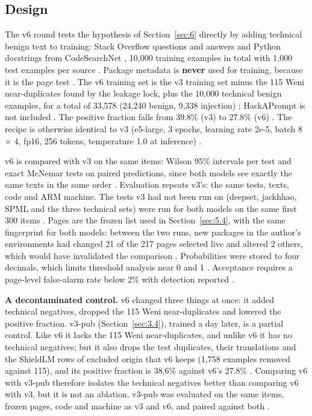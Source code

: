 \documentclass[11pt]{article}
\begin{document}
\subsection{Design}\label{sec:7.1}

The v6 round tests the hypothesis of Section~\ref{sec:6} directly by adding technical benign text to training: Stack Overflow questions and answers \citep{pacovaldez2022soquestions, koutch2023sopython} and Python docstrings from CodeSearchNet \citep{husain2019codesearchnet, nando2023codesearchnetpython}, 10,000 training examples in total with 1,000 test examples per source%
. Package metadata is \textbf{never} used for training, because it is the page test%
. The v6 training set is the v3 training set minus the 115 Weni near-duplicates found by the leakage lock, plus the 10,000 technical benign examples, for a total of 33,578 (24,240 benign, 9,338 injection)%
; HackAPrompt is not included%
. The positive fraction falls from 39.8\% (v3) to 27.8\% (v6)%
. The recipe is otherwise identical to v3 (e5-large, 3 epochs, learning rate 2e-5, batch 8 \ensuremath{\times} 4, fp16, 256 tokens, temperature 1.0 at inference)%
.

v6 is compared with v3 on the same items: Wilson 95\% intervals per test and exact McNemar tests \citep{mcnemar1947note} on paired predictions, since both models see exactly the same texts in the same order%
. Evaluation repeats v3's: the same tests, texts, code and ARM machine. The tests v3 had not been run on (deepset, jackhhao, SPML and the three technical sets) were run for both models on the same first 300 items%
. Pages are the frozen list used in Section~\ref{sec:5.4}, with the same fingerprint for both models: between the two runs, new packages in the author's environments had changed 21 of the 217 pages selected live and altered 2 others, which would have invalidated the comparison%
. Probabilities were stored to four decimals, which limits threshold analysis near 0 and 1%
. Acceptance requires a page-level false-alarm rate below 2\% with detection reported%
.

\textbf{A decontaminated control.} v6 changed three things at once: it added technical negatives, dropped the 115 Weni near-duplicates and lowered the positive fraction. v3-pub (Section~\ref{sec:3.4}), trained a day later, is a partial control. Like v6 it lacks the 115 Weni near-duplicates, and unlike v6 it has no technical negatives; but it also drops the test duplicates, their translations and the ShieldLM rows of excluded origin that v6 keeps (1,758 examples removed against 115), and its positive fraction is 38.6\% against v6's 27.8\%%
. Comparing v6 with v3-pub therefore isolates the technical negatives better than comparing v6 with v3, but it is not an ablation. v3-pub was evaluated on the same items, frozen pages, code and machine as v3 and v6, and paired against both%
.
\end{document}
